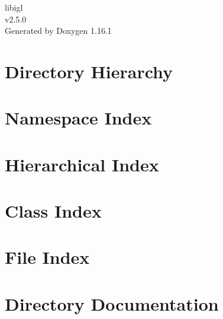 \documentclass[twoside]{book}
\newcommand{\+}{\discretionary{\mbox{\scriptsize$\hookleftarrow$}}{}{}}
\newcommand{\clearemptydoublepage}{%
    \newpage{\pagestyle{empty}\cleardoublepage}%
  }
\begin{document}
  \raggedbottom
    \hypersetup{pageanchor=false,
                bookmarksnumbered=true,
                pdfencoding=unicode
               }
  \begin{titlepage}
  \vspace*{7cm}
  \begin{center}%
  {\Large libigl}\\
  [1ex]\large v2.\+5.\+0 \\
  \vspace*{1cm}
  {\large Generated by Doxygen 1.16.1}\\
  \end{center}
  \end{titlepage}
  \clearemptydoublepage
  \tableofcontents
  \clearemptydoublepage
  \hypersetup{pageanchor=true}

\chapter{Directory Hierarchy}

\chapter{Namespace Index}

\chapter{Hierarchical Index}

\chapter{Class Index}

\chapter{File Index}

\chapter{Directory Documentation}




















\end{document}
